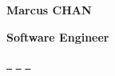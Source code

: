\begin{center}
    {\Huge\bfseries\color{primaryblue} Marcus CHAN}
    
    \vspace{4pt}
    
    {\large\color{secondaryblue}\textbf{Software Engineer}}
    
    
    
    \vspace{4pt}
    
    \href{https://github.com/marcuscjh}{\faGithub\ } \quad
    \href{https://linkedin.com/in/marcuschanjh}{\faLinkedin\ } \quad
    \href{https://marcuscjh.github.io}{\faGlobe\ }
\end{center}

\vspace{8pt} 